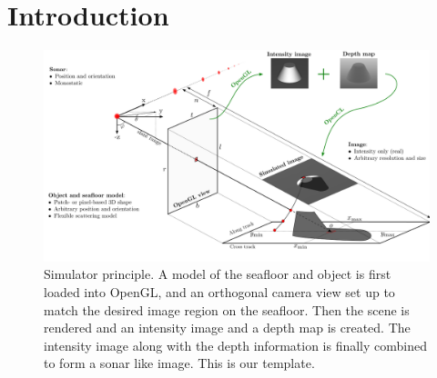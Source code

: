 \maketitle

\IEEEdisplaynotcompsoctitleabstractindextext


\IEEEpeerreviewmaketitle


\section{Introduction}

\setcounter{totalnumber}{1}
\setcounter{topnumber}{1}
\setcounter{dbltopnumber}{1}

\begin{figure}[t]\centering%
\includegraphics[width=\linewidth]{gfx/scene_coordinate_system.svg}%
\caption{Simulator principle. A model of the seafloor and object is first loaded into OpenGL, and an orthogonal camera view set up to match the desired image region on the seafloor. Then the scene is rendered and an intensity image and a depth map is created. The intensity image along with the depth information is finally combined to form a sonar like image. This is our template.}\label{simulator_coordinate_system}%
\end{figure}

